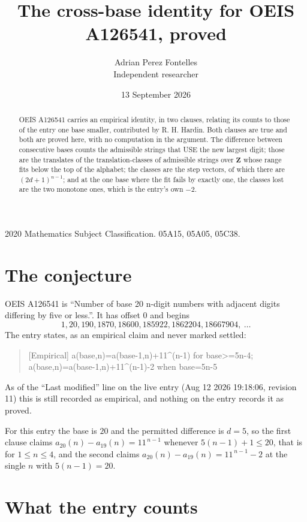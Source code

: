 \documentclass[11pt,a4paper]{article}
\title{The cross-base identity for OEIS A126541, proved}
\author{Adrian Perez Fontelles\\ \small Independent researcher}
\date{13 September 2026}
\theoremstyle{plain}
\theoremstyle{definition}
\begin{document}
\maketitle

\begin{abstract}
OEIS A126541 carries an empirical identity, in two clauses, relating its counts to those of the
entry one base smaller, contributed by R. H. Hardin. Both clauses are true and both are proved
here, with no computation in the argument. The difference between consecutive bases counts the
admissible strings that USE the new largest digit; those are the translates of the
translation-classes of admissible strings over $\mathbf{Z}$ whose range fits below the top of
the alphabet; the classes are the step vectors, of which there are $(2d+1)^{n-1}$; and at the
one base where the fit fails by exactly one, the classes lost are the two monotone ones, which
is the entry's own $-2$.
\end{abstract}

\noindent\small 2020 Mathematics Subject Classification. 05A15, 05A05, 05C38.\normalsize

\section{The conjecture}

OEIS A126541 is ``Number of base 20 n-digit numbers with adjacent digits differing by five or less.''. It has offset $0$ and begins
\[
1, 20, 190, 1870, 18600, 185922, 1862204, 18667904,\ \dots
\]
The entry states, as an empirical claim and never marked settled:
\begin{quote}
[Empirical] a(base,n)=a(base-1,n)+11\textasciicircum{}(n-1) for base>=5n-4; a(base,n)=a(base-1,n)+11\textasciicircum{}(n-1)-2 when base=5n-5
\end{quote}
As of the ``Last modified'' line on the live entry (Aug 12 2026 19:18:06, revision 11)
this is still recorded as empirical, and nothing on the entry records it as proved.

For this entry the base is $20$ and the permitted difference is $d=5$, so the first clause
claims $a_{20}(n)-a_{19}(n)=11^{\,n-1}$ whenever $5(n-1)+1\le20$, that is for
$1\le n\le4$, and the second claims $a_{20}(n)-a_{19}(n)=11^{\,n-1}-2$ at the single
$n$ with $5(n-1)=20$.

\section{What the entry counts}
\end{document}
